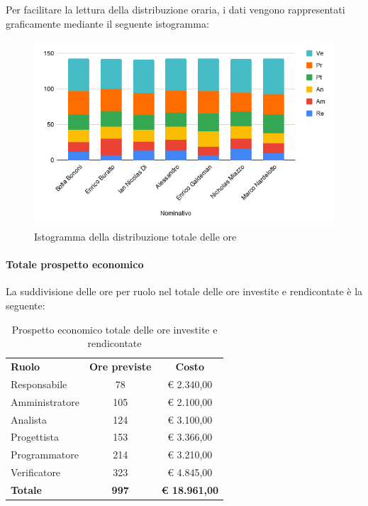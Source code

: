 \documentclass[../piano-di-progetto.tex]{subfiles}
\begin{document}
    Per facilitare la lettura della distribuzione oraria, i dati vengono rappresentati graficamente mediante il seguente istogramma:
    \begin{figure}[H]
      \centering
      \includegraphics[width=12cm]{img/ore-totale.png}
      \caption{Istogramma della distribuzione totale delle ore}
      \label{fig:ore-totali}
    \end{figure}

    \paragraph{Totale prospetto economico}
    La suddivisione delle ore per ruolo nel totale delle ore investite e rendicontate è la seguente:
    \begin{table}[H]
      \centering
      \begin{tabular}{lcc}
        \rowcolor{lightgray}
        \textbf{Ruolo}  & \textbf{Ore previste} & \textbf{Costo}  \\        
        Responsabile    & 78           & € 2.340,00           \\
        Amministratore  & 105          & € 2.100,00           \\
        Analista        & 124          & € 3.100,00           \\
        Progettista     & 153          & € 3.366,00           \\
        Programmatore   & 214          & € 3.210,00           \\
        Verificatore    & 323          & € 4.845,00           \\
        \textbf{Totale} & \textbf{997} & \textbf{€ 18.961,00}
      \end{tabular}
      \caption{Prospetto economico totale delle ore investite e rendicontate}
    \end{table}
\end{document}
